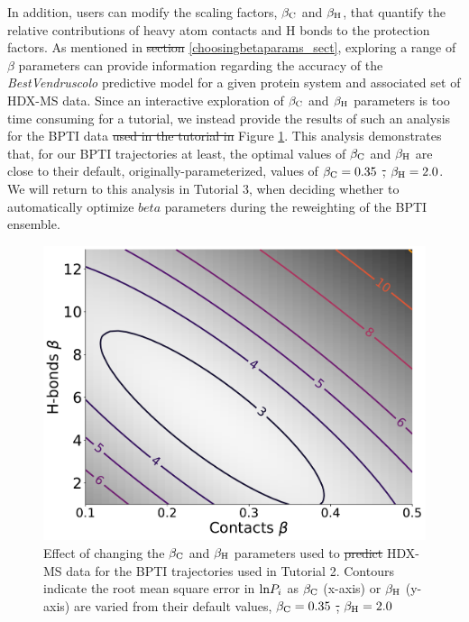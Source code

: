 \documentclass[9pt,tutorial]{livecoms}
\providecommand{\DIFadd}[1]{{\protect\color{blue}\uwave{#1}}} %
\providecommand{\DIFdel}[1]{{\protect\color{red}\sout{#1}}}                      %
\providecommand{\DIFaddbegin}{} %
\providecommand{\DIFaddend}{} %
\providecommand{\DIFdelbegin}{} %
\providecommand{\DIFdelend}{} %
\providecommand{\DIFaddFL}[1]{\DIFadd{#1}} %
\providecommand{\DIFdelFL}[1]{\DIFdel{#1}} %
\providecommand{\DIFaddbeginFL}{} %
\providecommand{\DIFaddendFL}{} %
\providecommand{\DIFdelbeginFL}{} %
\providecommand{\DIFdelendFL}{} %
\begin{document}
In addition, users can modify the scaling factors, $\beta_\textnormal{C}$ and $\beta_\textnormal{H}$, that quantify the relative contributions of heavy atom contacts and H bonds to the protection factors.
As mentioned in \DIFdelbegin \DIFdel{section }\DIFdelend \DIFaddbegin \DIFadd{Section }\DIFaddend \ref{choosingbetaparams_sect}, exploring a range of $\beta$ parameters can provide information regarding the accuracy of the \textit{BestVendruscolo} predictive model for a given protein system and associated set of HDX-MS data.
Since an interactive exploration of $\beta_\textnormal{C}$ and $\beta_\textnormal{H}$ parameters is too time consuming for a tutorial, we instead provide the results of such an analysis for the BPTI data \DIFdelbegin \DIFdel{used in the tutorial in }\DIFdelend \DIFaddbegin \DIFadd{in }\DIFaddend Figure \ref{fig:contourplot}.
This analysis demonstrates that, for our BPTI trajectories at least, the optimal values of $\beta_\textnormal{C}$ and $\beta_\textnormal{H}$ are close to their default, originally-parameterized, values of $\beta_\textnormal{C} = 0.35$ \DIFdelbegin \DIFdel{, }\DIFdelend \DIFaddbegin \DIFadd{and }\DIFaddend $\beta_\textnormal{H} = 2.0$.
We will return to this analysis in Tutorial 3, when deciding whether to automatically optimize \DIFdelbegin \DIFdel{$beta$ }\DIFdelend \DIFaddbegin \DIFadd{$\beta$ }\DIFaddend parameters during the reweighting of the BPTI ensemble.

\begin{figure}
    \includegraphics[width=0.98\linewidth]{Fig3_BPTI_noreweight_contour_plot_v2.pdf}
    \caption{Effect of changing the $\beta_\textnormal{C}$ and $\beta_\textnormal{H}$ parameters used to \DIFdelbeginFL \DIFdelFL{predict }\DIFdelendFL \DIFaddbeginFL \DIFaddFL{calculate }\DIFaddendFL HDX-MS data for the BPTI trajectories used in Tutorial 2. Contours indicate the root mean square error in $\textnormal{ln}{P_i}$ as $\beta_\textnormal{C}$ (x-axis) or $\beta_\textnormal{H}$ (y-axis) are varied from their default values, $\beta_\textnormal{C} = 0.35$ \DIFdelbeginFL \DIFdelFL{, }\DIFdelendFL \DIFaddbeginFL \DIFaddFL{and }\DIFaddendFL $\beta_\textnormal{H} = 2.0$}
    \label{fig:contourplot}
\end{figure}
\end{document}
